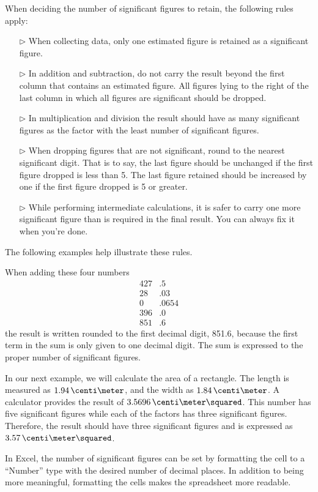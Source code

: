 When deciding the number of significant figures to retain, the following rules apply:
\begin{itemize}
	\item[\(\triangleright\)] When collecting data, only one estimated figure is retained as a significant figure.
	\item[\(\triangleright\)] In addition and subtraction, do not carry the result beyond the first column that contains an estimated figure. All figures lying to the right of the last column in which all figures are significant should be dropped.
	\item[\(\triangleright\)] In multiplication and division the result should have as many significant figures as the factor with the least number of significant figures.
	\item[\(\triangleright\)] When dropping figures that are not significant, round to the nearest significant digit.  That is to say, the last figure should be unchanged if the first figure dropped is less than 5.  The last figure retained should be increased by one if the first figure dropped is 5 or greater.
	\item[\(\triangleright\)] While performing intermediate calculations, it is safer to carry one more significant figure than is required in the final result.  You can always fix it when you're done.
\end{itemize}
The following examples help illustrate these rules.

When adding these four numbers
\begin{equation*}
	\begin{aligned} %
		427&.5\\
		28&.03\\
		0&.0654\\
		396&.0\\
		\hline
		851&.6
	\end{aligned}
\end{equation*}
the result is written rounded to the first decimal digit, 851.6, because the first term in the sum is only given to one decimal digit. The sum is expressed to the proper number of significant figures.

In our next example, we will calculate the area of a rectangle. The length is measured as $1.94\,\centi\meter$, and the width as $1.84\,\centi\meter$. A calculator provides the result of $3.5696\,\centi\meter\squared$. This number has five significant figures while each of the factors has three significant figures. Therefore, the result should have three significant figures and is expressed as $3.57\,\centi\meter\squared$.

In Excel, the number of significant figures can be set by formatting the cell to a ``Number'' type with the desired number of decimal places. In addition to being more meaningful, formatting the cells makes the spreadsheet more readable.
